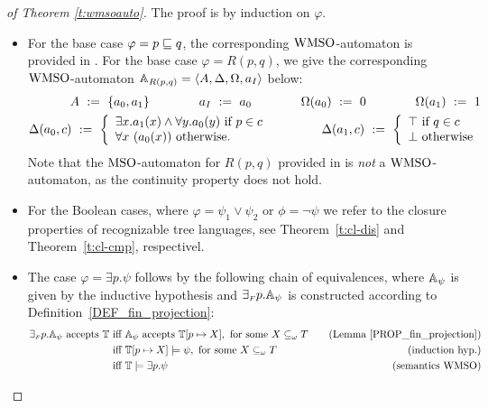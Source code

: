 \begin{proof}[of Theorem \ref{t:wmsoauto}] The proof is by induction on $\varphi$.
\begin{itemize}
  \item For the base case $\varphi = p \sqsubseteq q$, the corresponding 
  $\mathrm{WMSO}$-automaton is provided in \cite[Ex. 2.6]{Zanasi:Thesis:2012}. 
  For the base case $\varphi = R(p,q)$, we give the corresponding 
  $\mathrm{WMSO}$-automaton $\mathbb{A}_{R(p,q)} = \langle{A,\Delta,\Omega,a_I}\rangle$ below:
\begin{eqnarray*}
        A  \  \mathrel{: =} \  \{a_0,a_1\}  \qquad \qquad  a_I  \   \mathrel{: =}  \  a_0   \qquad \qquad   \Omega(a_0)  \  \mathrel{: =} \  0 \qquad \qquad
    \Omega(a_1)  \  \mathrel{: =} \  1 \\
  \Delta(a_0,c)  \  \mathrel{: =} \  \left\{
	\begin{array}{ll}
           \exists x. a_1(x) \wedge \forall y. a_0(y)  \  \mbox{if }p \in c 
	\\ \forall x\ (a_0(x))  \  \mbox{otherwise.}
	\end{array}
\right. \qquad \qquad
  \Delta(a_1,c)  \  \mathrel{: =} \  \left\{
	\begin{array}{ll}
        \top  \  \mbox{if }q \in c \\
        \bot  \  \mbox{otherwise}
	\end{array}
\right.
\end{eqnarray*}
Note that the $\mathrm{MSO}$-automaton for $R(p,q)$ provided in 
\cite[Ex. 2.5]{Zanasi:Thesis:2012} is \emph{not} a $\mathrm{WMSO}$-automaton, as the 
continuity property does not hold.

\item
For the Boolean cases, where $\varphi = \psi_1 \vee \psi_2$ or $\phi = \neg\psi$
we refer to the closure properties of recognizable tree languages, see 
Theorem~\ref{t:cl-dis} and Theorem~\ref{t:cl-cmp}, 
respectivel.
  
\item 
The case $\varphi = \exists p. \psi$ follows by the following chain of
equivalences, where $\mathbb{A}_{\psi}$ is given by the inductive hypothesis and 
${\exists_{{\scriptscriptstyle F}} p}.\mathbb{A}_{\psi}$ is constructed according to 
Definition~\ref{DEF_fin_projection}:
\begin{alignat*}{2}
{\finexists p}.\aut_{\psi} \text{ accepts }\mb{T} 
   & \text{ iff }
     \aut_{\psi} \text{ accepts } \mb{T}[p \mapsto X], 
     \text{ for some } X \sse_{\om} T
   & \quad\text{(Lemma~\ref{PROP_fin_projection})}
\\ & \text{ iff }
     \mb{T}[p \mapsto X] \models \psi,
     \text{ for some } X \sse_{\om} T
   & \quad\text{(induction hyp.)}
\\ & \text{ iff }
    \mb{T} \models \exists p. \psi
   & \quad\text{(semantics $\wmso$)}
\end{alignat*}
\end{itemize}
\end{proof}






